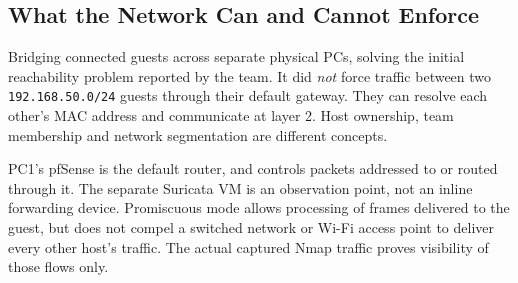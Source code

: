 \documentclass[11pt,a4paper]{article}
\begin{document}
\subsection{What the Network Can and Cannot Enforce}
Bridging connected guests across separate physical PCs, solving the initial reachability problem reported by the team. It did \emph{not} force traffic between two \texttt{192.168.50.0/24} guests through their default gateway. They can resolve each other's MAC address and communicate at layer 2. Host ownership, team membership and network segmentation are different concepts.

PC1's pfSense is the default router, and controls packets addressed to or routed through it. The separate Suricata VM is an observation point, not an inline forwarding device. Promiscuous mode allows processing of frames delivered to the guest, but does not compel a switched network or Wi-Fi access point to deliver every other host's traffic. The actual captured Nmap traffic proves visibility of those flows only.
\end{document}
